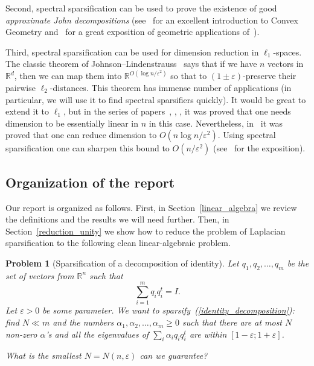 \documentclass[12pt]{article}
\newcommand{\eps}{\varepsilon}
\newtheorem{problem}{Problem}
\begin{document}
    Second, spectral sparsification can be used to prove the existence of good \emph{approximate John decompositions}
    (see~\cite{B97} for an excellent introduction to Convex Geometry and~\cite{N11} for a great exposition of geometric
    applications of~\cite{BSS09}).

    Third, spectral sparsification can be used for dimension reduction in $\ell_1$-spaces.
    The classic theorem of Johnson--Lindenstrauss~\cite{DG03}
    says that if we have $n$ vectors in $\mathbb{R}^d$, then we can map them into $\mathbb{R}^{O(\log n / \eps^2)}$
    so that to $(1\pm\eps)$-preserve their pairwise $\ell_2$-distances.
    This theorem has immense number of applications (in particular, we will use it to find spectral sparsifiers quickly).
    It would be great to extend it to $\ell_1$, but in the series of papers~\cite{BC05}, \cite{LN04}, \cite{ACNN11},
    \cite{R11a} it was proved that one needs dimension to be essentially linear in $n$ in this case.
    Nevertheless, in~\cite{T90}
    it was proved that one can reduce dimension to $O(n \log n / \eps^2)$. Using spectral sparsification one can sharpen
    this bound to $O(n / \eps^2)$ (see~\cite{N11} for the exposition).

    \subsection{Organization of the report}

    Our report is organized as follows. First, in Section~\ref{linear_algebra} we review the definitions and the results
    we will need further. Then, in Section~\ref{reduction_unity} we show how to reduce the problem of Laplacian
    sparsification to the following clean linear-algebraic problem.
    \begin{problem}[Sparsification of a decomposition of identity]
        Let $q_1, q_2, \ldots, q_m$ be the set of vectors from $\mathbb{R}^n$ such that
        \begin{equation}
            \label{identity_decomposition}
            \sum_{i=1}^m q_i q_i^t = I.
        \end{equation}
        Let $\eps > 0$ be some parameter. We want to sparsify~(\ref{identity_decomposition}): find $N \ll m$ and
        the numbers $\alpha_1, \alpha_2, \ldots, \alpha_m \geq 0$ such that there are at most $N$ non-zero
        $\alpha$'s and all the eigenvalues of $\sum_i \alpha_i q_i q_i^t$ are within $[1 - \eps; 1 + \eps]$.

        What is the smallest $N = N(n, \eps)$ can we guarantee?
    \end{problem}
\end{document}
